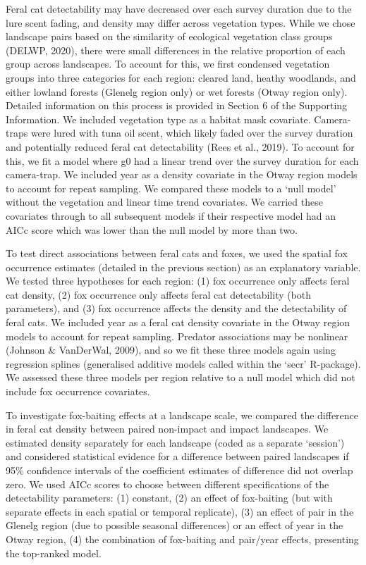 \documentclass[]{elsarticle} %
\begin{document}
Feral cat detectability may have decreased over each survey duration due to the lure scent fading, and density may differ across vegetation types. While we chose landscape pairs based on the similarity of ecological vegetation class groups (DELWP, 2020), there were small differences in the relative proportion of each group across landscapes. To account for this, we first condensed vegetation groups into three categories for each region: cleared land, heathy woodlands, and either lowland forests (Glenelg region only) or wet forests (Otway region only). Detailed information on this process is provided in Section 6 of the Supporting Information. We included vegetation type as a habitat mask covariate. Camera-traps were lured with tuna oil scent, which likely faded over the survey duration and potentially reduced feral cat detectability (Rees et al., 2019). To account for this, we fit a model where g0 had a linear trend over the survey duration for each camera-trap. We included year as a density covariate in the Otway region models to account for repeat sampling. We compared these models to a `null model' without the vegetation and linear time trend covariates. We carried these covariates through to all subsequent models if their respective model had an AICc score which was lower than the null model by more than two.

To test direct associations between feral cats and foxes, we used the spatial fox occurrence estimates (detailed in the previous section) as an explanatory variable. We tested three hypotheses for each region: (1) fox occurrence only affects feral cat density, (2) fox occurrence only affects feral cat detectability (both parameters), and (3) fox occurrence affects the density and the detectability of feral cats. We included year as a feral cat density covariate in the Otway region models to account for repeat sampling. Predator associations may be nonlinear (Johnson \& VanDerWal, 2009), and so we fit these three models again using regression splines (generalised additive models called within the `secr' R-package). We assessed these three models per region relative to a null model which did not include fox occurrence covariates.

To investigate fox-baiting effects at a landscape scale, we compared the difference in feral cat density between paired non-impact and impact landscapes. We estimated density separately for each landscape (coded as a separate `session') and considered statistical evidence for a difference between paired landscapes if 95\% confidence intervals of the coefficient estimates of difference did not overlap zero. We used AICc scores to choose between different specifications of the detectability parameters: (1) constant, (2) an effect of fox-baiting (but with separate effects in each spatial or temporal replicate), (3) an effect of pair in the Glenelg region (due to possible seasonal differences) or an effect of year in the Otway region, (4) the combination of fox-baiting and pair/year effects, presenting the top-ranked model.
\end{document}
